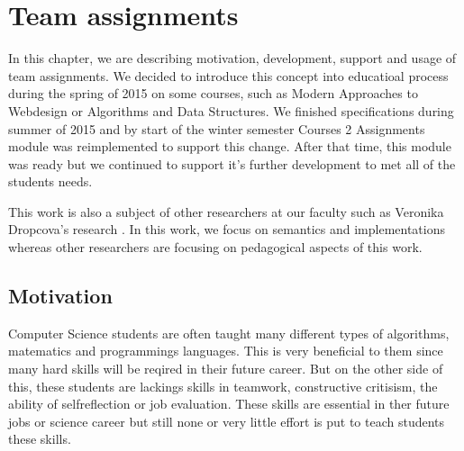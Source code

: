\chapter{Team assignments}



\label{sec:teamprojects}
In this chapter, we are describing motivation, development, support and usage of team assignments. We decided to introduce this concept into educatioal process during the spring of 2015 on some courses, such as Modern Approaches to Webdesign or Algorithms and Data Structures. We finished specifications during summer of 2015 and by start of the winter semester   Courses 2 Assignments module was reimplemented to support this change. After that time, this module was ready but we continued to support it's further development to met all of the students needs.



This work is also a subject of other researchers at our faculty such as Veronika Dropcova's research \cite{dropcova}. In this work, we focus on semantics and implementations whereas other researchers are focusing on pedagogical aspects of this work.


\section{Motivation}

Computer Science students are often taught many different types of algorithms, matematics and programmings languages. This is very beneficial to them since many hard skills will be reqired in their future career. But on the other side of this, these students are lackings skills in teamwork, constructive critisism, the ability of self\-reflection or job evaluation.  These skills are essential in ther future jobs or science career but still none or very little effort is put to teach students these skills. 

